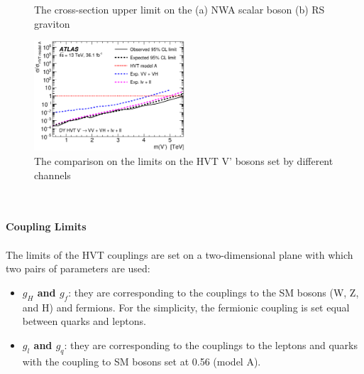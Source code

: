 \begin{figure}[ht]
	\centering
	\caption{The cross-section upper limit on the (a) NWA scalar boson (b) RS graviton}
	\label{Fig:limit_GGF_comb}
\end{figure}
\begin{figure}[ht]
	\centering
    \includegraphics[width=0.5\textwidth]{Chapter4/GGFALLHVTV_compare.eps}
    \caption{The comparison on the limits on the HVT V' bosons set by different channels}
	\label{Fig:limit_GGFHVTV_compare}
\end{figure}
\noindent
\\
\\{\bf Coupling Limits}
\\
\\The limits of the HVT couplings are set on a two-dimensional plane with which two pairs of parameters are used:
\begin{itemize}
  \item[] {\bf $g_{H}$ and $g_{f}$}: they are corresponding to the couplings to the SM bosons (W, Z, and H) and fermions. For the simplicity, the fermionic coupling is set equal between quarks and leptons. 
  \item[] {\bf $g_{l}$ and $g_{q}$}: they are corresponding to the couplings to the leptons and quarks with the coupling to SM bosons set at 0.56 (model A).
\end{itemize}
